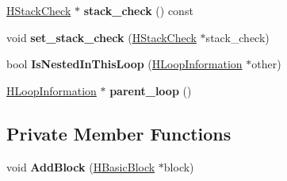 \begin{DoxyCompactItemize}
\item 
\hyperlink{classv8_1_1internal_1_1_h_stack_check}{H\+Stack\+Check} $\ast$ {\bfseries stack\+\_\+check} () const \hypertarget{classv8_1_1internal_1_1_h_loop_information_a172dd7808bb5da4f49badf8c978d09ac}{}\label{classv8_1_1internal_1_1_h_loop_information_a172dd7808bb5da4f49badf8c978d09ac}

\item 
void {\bfseries set\+\_\+stack\+\_\+check} (\hyperlink{classv8_1_1internal_1_1_h_stack_check}{H\+Stack\+Check} $\ast$stack\+\_\+check)\hypertarget{classv8_1_1internal_1_1_h_loop_information_a406485921caafe1cb4d27b4fd7b2bb05}{}\label{classv8_1_1internal_1_1_h_loop_information_a406485921caafe1cb4d27b4fd7b2bb05}

\item 
bool {\bfseries Is\+Nested\+In\+This\+Loop} (\hyperlink{classv8_1_1internal_1_1_h_loop_information}{H\+Loop\+Information} $\ast$other)\hypertarget{classv8_1_1internal_1_1_h_loop_information_aa8d8b9b7cf329d0e9da65d44dbb9bb3b}{}\label{classv8_1_1internal_1_1_h_loop_information_aa8d8b9b7cf329d0e9da65d44dbb9bb3b}

\item 
\hyperlink{classv8_1_1internal_1_1_h_loop_information}{H\+Loop\+Information} $\ast$ {\bfseries parent\+\_\+loop} ()\hypertarget{classv8_1_1internal_1_1_h_loop_information_a187ceb259e86258277ddd909dab4d907}{}\label{classv8_1_1internal_1_1_h_loop_information_a187ceb259e86258277ddd909dab4d907}

\end{DoxyCompactItemize}
\subsection*{Private Member Functions}
\begin{DoxyCompactItemize}
\item 
void {\bfseries Add\+Block} (\hyperlink{classv8_1_1internal_1_1_h_basic_block}{H\+Basic\+Block} $\ast$block)\hypertarget{classv8_1_1internal_1_1_h_loop_information_a70ede660d41a073f50f9531cdd3beeda}{}\label{classv8_1_1internal_1_1_h_loop_information_a70ede660d41a073f50f9531cdd3beeda}

\end{DoxyCompactItemize}
